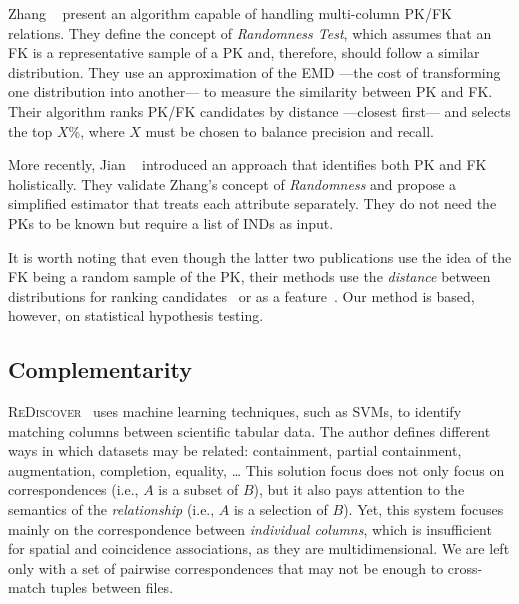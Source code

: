 Zhang \etal~\cite{Zhang2010} present an algorithm capable of handling multi-column
\gls{PK}/\gls{FK} relations.
They define the concept of \emph{Randomness Test}, which assumes that an \gls{FK} is a representative
sample of a \gls{PK} and, therefore, should follow a similar distribution.
They use an approximation of the \gls{EMD} ---the cost of transforming one distribution into another---
to measure the similarity between \gls{PK} and \gls{FK}.
Their algorithm ranks \gls{PK}/\gls{FK} candidates by distance ---closest first--- and selects
the top $X\%$, where $X$ must be chosen to balance precision and recall.

More recently, Jian \etal~\cite{jiang_holistic_2020} introduced an approach that identifies
both \gls{PK} and \gls{FK} holistically. They validate Zhang's concept of \emph{Randomness}
and propose a simplified estimator that treats each attribute separately. They do not need
the \glspl{PK} to be known but require a list of \glspl{IND} as input.

It is worth noting that even though the latter two publications use the idea of the
\gls{FK} being a random sample of the \gls{PK}, their methods use the \emph{distance} between
distributions for ranking candidates~\cite{Zhang2010} or as a feature~\cite{jiang_holistic_2020}.
Our method is based, however, on statistical hypothesis testing\footnotemark.


\subsection{Complementarity}

\textsc{ReDiscover}~\cite{alawini2016} uses machine learning techniques, such as
\glspl{SVM}, to identify matching columns between scientific tabular data.
The author defines different ways in which datasets may be related:
containment, partial containment, augmentation, completion, equality, \ldots
This solution focus does not only focus on correspondences (i.e., $A$ is a subset of $B$),
but it also pays attention to the semantics of the \emph{relationship} (i.e., $A$
is a selection of $B$).
Yet, this system focuses mainly on the correspondence between \emph{individual columns},
which is insufficient for spatial and coincidence associations, as they are multidimensional.
We are left only with a set of pairwise correspondences that may not be enough to cross-match
tuples between files.

